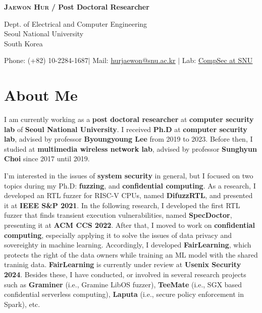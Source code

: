 \documentclass[letterpaper,11pt]{article}
\begin{document}


\begin{center}
    \textbf{\Huge \scshape Jaewon Hur} \textbf{ /  Post Doctoral Researcher} \\ \vspace{10pt}
    
    Dept. of Electrical and Computer Engineering \\
    Seoul National University \\
    South Korea \\ \vspace{10pt}
    
    \small Phone: (+82) 10-2284-1687$|$ Mail: \href{mailto:hurjaewon@snu.ac.kr}{\underline{hurjaewon@snu.ac.kr}} $|$ 
    Lab: \href{https://compsec.snu.ac.kr}{\underline{CompSec at SNU}}
\end{center}

\vspace{15pt}
\section{About Me}

I am currently working as a \textbf{post doctoral researcher} at \textbf{computer security lab} of \textbf{Seoul National University}. I received \textbf{Ph.D} at \textbf{computer security lab}, advised by professor \textbf{Byoungyoung Lee} from 2019 to 2023. Before then, I studied at \textbf{multimedia wireless network lab}, advised by professor \textbf{Sunghyun Choi} since 2017 until 2019.

I'm interested in the issues of \textbf{system security} in general, but I focused on two topics during my Ph.D: \textbf{fuzzing}, and \textbf{confidential computing}. As a research, I developed an RTL fuzzer for RISC-V CPUs, named \textbf{DifuzzRTL}, and presented it at \textbf{IEEE S\&P 2021}. In the following research, I developed the first RTL fuzzer that finds transient execution vulnerabilities, named \textbf{SpecDoctor}, presenting it at \textbf{ACM CCS 2022}. After that, I moved to work on \textbf{confidential computing}, especially applying it to solve the issues of data privacy and sovereighty in machine learning. Accordingly, I developed \textbf{FairLearning}, which protects the right of the data owners while training an ML model with the shared traninig data. \textbf{FairLearning} is currently under review at \textbf{Usenix Security 2024}. Besides these, I have conducted, or involved in several research projects such as \textbf{Graminer} (i.e., Gramine LibOS fuzzer), \textbf{TeeMate} (i.e., SGX based confidential serverless computing), \textbf{Laputa} (i.e., secure policy enforcement in Spark), etc.
\end{document}
